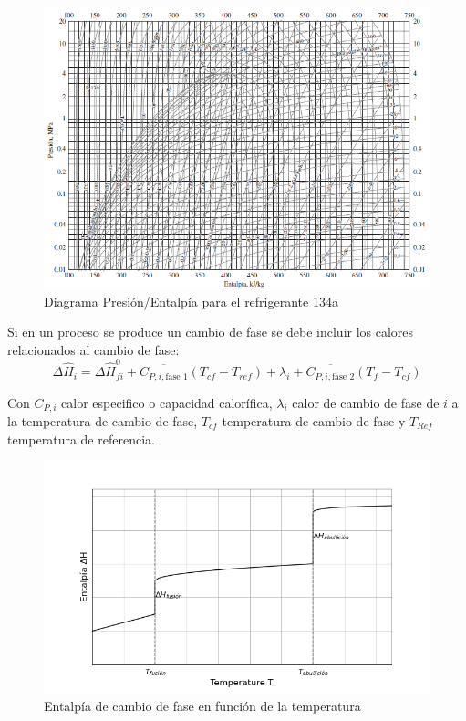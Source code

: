             \begin{figure}
                \centering
                \includegraphics[width=\textwidth]{img/graficos/H_P_refrigerante.png}
                \caption[Diagrama Presión/Entalpía]{Diagrama Presión/Entalpía para el refrigerante 134a \cite{cengel_termodinamica_2012}}
                \label{fig:p_h_entalpia}
            \end{figure}
        
            
            Si en un proceso se produce un cambio de fase se debe incluir los calores relacionados al cambio de fase:
            \begin{equation}
            \label{eq:entalpia_cambio_fase}
                \Delta \widehat{H}_{i} = \Delta \widehat{H}_{fi}^{0} + \overline{C_{P,i,\text{fase }1}} \left ( T_{cf} - T_{ref} \right ) + \lambda_{i} + \overline{C_{P,i,\text{fase }2}} \left ( T_{f} - T_{cf} \right )
            \end{equation}
            
            Con \(C_{P, i}\) calor especifico o capacidad calorífica, \(\lambda_{i}\) calor de cambio de fase de \(i\) a la temperatura de cambio de fase, \(T_{cf}\) temperatura de cambio de fase y \(T_{Ref}\) temperatura de referencia.
            
            \begin{figure}
                \centering
                \includegraphics[width=.7\textwidth]{img/graficos/entalpia_fase.png}
                \caption{Entalpía de cambio de fase en función de la temperatura}
                \label{fig:entalpia_fase}
            \end{figure}
            
